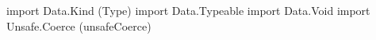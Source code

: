 \begin{code}
import Data.Kind (Type)
import Data.Typeable
import Data.Void
import Unsafe.Coerce (unsafeCoerce)
\end{code}
